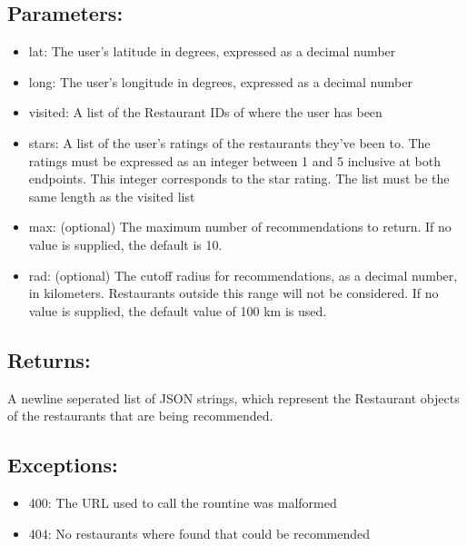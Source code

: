 \documentclass{article}
\begin{document}
\subsection*{Parameters:}
\begin{itemize}
  \item lat: The user's latitude in degrees, expressed as a decimal number
  \item long: The user's longitude in degrees, expressed as a decimal number
  \item visited: A list of the Restaurant IDs of where the user has been
  \item stars: A list of the user's ratings of the restaurants they've been to.
  The ratings must be expressed as an integer between 1 and 5 inclusive at both
  endpoints. This integer corresponds to the star rating. The list must be the
  same length as the visited list 
  \item max: (optional) The maximum number of recommendations to return. If no
  value is supplied, the default is 10.
  \item rad: (optional) The cutoff radius for recommendations, as a
  decimal number, in kilometers. Restaurants outside this range will not be
  considered. If no value is supplied, the default value of 100 km is used.
\end{itemize}
\subsection*{Returns:}
A newline seperated list of JSON strings, which represent the Restaurant
objects of the restaurants that are being recommended.
\subsection*{Exceptions:}
\begin{itemize}
  \item 400: The URL used to call the rountine was malformed
  \item 404: No restaurants where found that could be recommended
\end{itemize}
\end{document}
